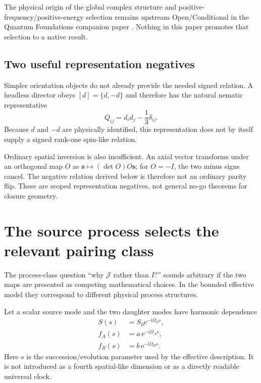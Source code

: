 \documentclass[11pt]{article}
\theoremstyle{remark}
\newcommand{\ii}{\mathrm{i}}
\newcommand{\ee}{\mathrm{e}}
\begin{document}
The physical origin of the global complex structure and positive-frequency/positive-energy
selection remains upstream Open/Conditional in the Quantum Foundations companion paper
\cite{CmotionQuantumFoundations2026}.  Nothing in this paper promotes that
selection to a native result.

\subsection{Two useful representation negatives}

Simpler orientation objects do not already provide the needed signed relation.  A headless director
obeys \([d]=\{d,-d\}\) and therefore has the natural nematic representative
\begin{equation}
  Q_{ij}=d_i d_j-\frac13\delta_{ij}.
  \label{eq:nematic}
\end{equation}
Because \(d\) and \(-d\) are physically identified, this representation does not by itself supply a
signed rank-one spin-like relation.

Ordinary spatial inversion is also insufficient.  An axial vector transforms under an orthogonal
map \(O\) as \(\bm s\mapsto(\det O)O\bm s\); for \(O=-I\), the two minus signs cancel.  The negative
relation derived below is therefore not an ordinary parity flip.  These are scoped representation
negatives, not general no-go theorems for closure geometry.

\section{The source process selects the relevant pairing class}
\label{sec:process_class}

The process-class question ``why \(\mathcal J\) rather than \(I\)?'' sounds arbitrary if the two maps are
presented as competing mathematical choices.  In the bounded effective model they correspond to
different physical process structures.

Let a scalar source mode and the two daughter modes have harmonic dependence
\begin{equation}
\begin{split}
  S(s)&=S_0\ee^{-\ii\Omega_S s},\\
  f_A(s)&=a\,\ee^{-\ii\Omega_A s},\\
  f_B(s)&=b\,\ee^{-\ii\Omega_B s}.
\end{split}
\label{eq:harmonic_modes}
\end{equation}
Here \(s\) is the succession/evolution parameter used by the effective description.  It is not
introduced as a fourth spatial-like dimension or as a directly readable universal clock.
\end{document}
